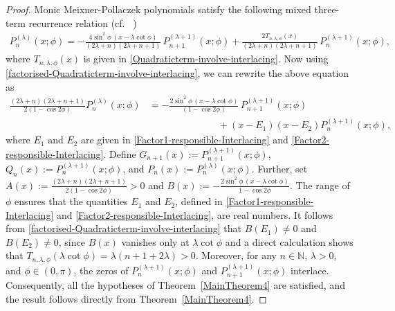\documentclass[final,3p,times,12pt]{elsarticle}
\numberwithin{equation}{section}  %
\begin{document}
	\begin{proof}
		Monic Meixner-Pollaczek polynomials satisfy the following mixed three-term recurrence relation (cf. ~\cite[eq. ~(3.3)]{Jooste-Jordaan-Numeralg-2025})
		\begin{align}
			P_{n}^{(\lambda)}(x;\phi) =  - \frac{4 \sin^2 \phi \,(x - \lambda \cot \phi)}{(2 \lambda + n)(2 \lambda + n + 1)}\, P_{n+1}^{(\lambda+1)}(x;\phi)+
			\frac{2T_{n,\lambda,\phi}(x)}{(2 \lambda + n)(2 \lambda + n + 1)}\, P_{n}^{(\lambda+1)}(x;\phi),
		\end{align}
		where $T_{n,\lambda,\phi}(x)$ is given in \eqref{Quadraticterm-involve-interlacing}. Now using \eqref{factorised-Quadraticterm-involve-interlacing}, we can rewrite the above equation as 
		\begin{align}
			\nonumber	\frac{(2 \lambda + n)(2 \lambda + n + 1)}{2(1-\cos2\phi)}	P_{n}^{(\lambda)}(x;\phi) &=  - \frac{2 \sin^2 \phi \,(x - \lambda \cot \phi)}{(1-\cos2\phi)}\, P_{n+1}^{(\lambda+1)}(x;\phi)\\
			&\hspace{3cm}+ (x-E_1)(x-E_2)
			P_{n}^{(\lambda+1)}(x;\phi),
		\end{align}
		where $E_1$ and $E_2$ are given in \eqref{Factor1-responsible-Interlacing} and \eqref{Factor2-responsible-Interlacing}. Define
		$G_{n+1}(x) := P_{n+1}^{(\lambda+1)}(x;\phi)$,
		$Q_{n}(x) := P_{n}^{(\lambda+1)}(x;\phi)$,
		and
		$P_{n}(x) := P_{n}^{(\lambda)}(x;\phi)$.
		Further, set
		$A(x) := \frac{(2 \lambda + n)(2 \lambda + n + 1)}{2(1-\cos 2\phi)} > 0$
		and
		$B(x) := -\frac{2 \sin^2 \phi \,(x - \lambda \cot \phi)}{1-\cos 2\phi}$. The range of $\phi$ ensures that the quantities $E_1$ and $E_2$, defined in
		\eqref{Factor1-responsible-Interlacing} and
		\eqref{Factor2-responsible-Interlacing}, are real numbers.
		It follows from \eqref{factorised-Quadraticterm-involve-interlacing} that
		$B(E_1) \neq 0$ and $B(E_2) \neq 0$, since $B(x)$ vanishes only at $\lambda \cot\phi$ and a direct calculation shows that $T_{n,\lambda,\phi}(\lambda\cot\phi)=\lambda(n+1+2\lambda)>0$.
		Moreover, for any $n \in \mathbb{N}$, $\lambda > 0$, and $\phi \in (0,\pi)$,
		the zeros of $P_{n}^{(\lambda+1)}(x;\phi)$ and $P_{n+1}^{(\lambda+1)}(x;\phi)$
		interlace. Consequently, all the hypotheses of Theorem~\ref{MainTheorem4}
		are satisfied, and the result follows directly from Theorem~\ref{MainTheorem4}.
	\end{proof}
	
\end{document}
